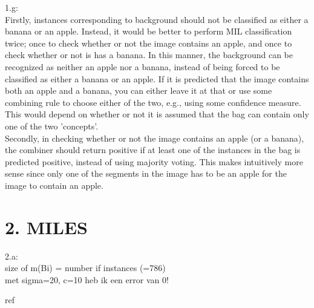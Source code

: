 \documentclass [a4paper] {report}
\begin{document}
	1.g: \\
	
	Firstly, instances corresponding to background should not be classified as either a banana or an apple. Instead, it would be better to perform MIL classification twice; once to check whether or not the image contains an apple, and once to check whether or not is has a banana. In this manner, the background can be recognized as neither an apple nor a banana, instead of being forced to be classified as either a banana or an apple. If it is predicted that the image contains both an apple and a banana, you can either leave it at that or use some combining rule to choose either of the two, e.g., using some confidence measure. This would depend on whether or not it is assumed that the bag can contain only one of the two 'concepts'.\\
	
	Secondly, in checking whether or not the image contains an apple (or a banana), the combiner should return positive if at least one of the instances in the bag is predicted positive, instead of using majority voting. This makes intuitively more sense since only one of the segments in the image has to be an apple for the image to contain an apple.
	
	\section*{2. MILES}
	2.a:\\
	
	size of m(Bi) = number if instances (=786)\\
	met sigma=20, c=10 heb ik een error van 0! 
	
	
	\begin{bibliography}{ref}
		
	\end{bibliography}
\end{document}
